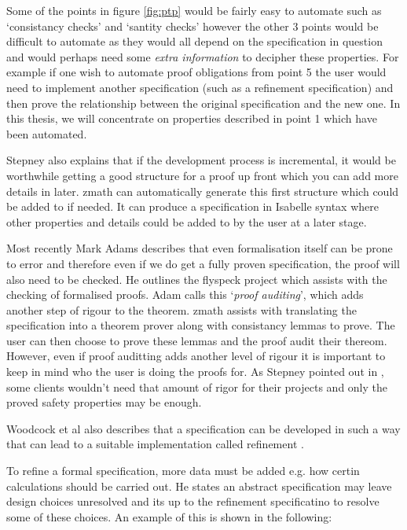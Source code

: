 Some of the points in figure \ref{fig:ptp} would be fairly easy to automate such as `consistancy checks' and `santity checks' however the other 3 points would be difficult to automate as they would all depend on the specification in question and would perhaps need some \emph{extra information} to decipher these properties. For example if one wish to automate proof obligations from point 5 the user would need to implement another specification (such as a refinement specification) and then prove the relationship between the original specification and the new one. In this thesis, we will concentrate on properties described in point 1 which have been automated. 

Stepney also explains that if the development process is incremental, it would be worthwhile getting a good structure for a proof up front which you can add more details in later. \gls{zmath}  can automatically generate this first structure which could be added to if needed. It can produce a specification in Isabelle syntax where other properties and details could be added to by the user at a later stage.

Most recently Mark Adams \cite{JFR4576} describes that even formalisation itself can be prone to error and therefore even if we do get a fully proven specification, the proof will also need to be checked. He outlines the flyspeck project which assists with the checking of formalised proofs. Adam calls this `\emph{proof auditing}', which adds another step of rigour to the theorem. \gls{zmath} assists with translating the specification into a theorem prover along with consistancy lemmas to prove. The user can then choose to prove these lemmas and the proof audit their thereom. However, even if proof auditting adds another level of rigour it is important to keep in mind who the user is doing the proofs for. As Stepney pointed out in \cite{stepney1998tale}, some clients wouldn't need that amount of rigor for their projects and only the proved safety properties may be enough.

Woodcock et al also describes that a specification can be developed in such a way that can lead to a suitable implementation called refinement \cite{Woodcock:1996:UZS:235337}. 

To refine a formal specification, more data must be added e.g. how certin calculations should be carried out. He states an abstract specification may leave design choices unresolved and its up to the refinement specificatino to resolve some of these choices. An example of this is shown in the following:

